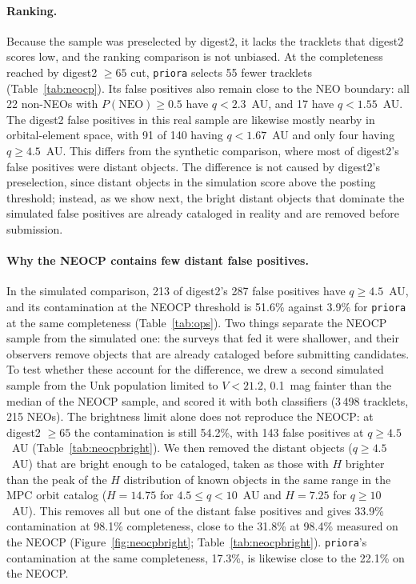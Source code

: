 \documentclass[linenumbers,twocolumn]{aastex701}
\newcommand{\priora}{{\tt priora}\xspace} %
\begin{document}
\paragraph{Ranking.}
Because the sample was preselected by digest2, it lacks the tracklets that
digest2 scores low, and the ranking comparison is not unbiased. At the
completeness reached by digest2 $\ge65$ cut, \priora selects
55 fewer tracklets (Table~\ref{tab:neocp}). Its false positives also remain
close to the NEO boundary: all 22 non-NEOs with
$P(\mathrm{NEO})\ge0.5$ have $q<2.3$~AU, and 17 have
$q<1.55$~AU. The digest2 false positives in this real sample are likewise
mostly nearby in orbital-element space, with 91 of 140 having
$q<1.67$~AU and only four having $q\ge4.5$~AU.
This differs from the synthetic comparison, where most of digest2's false
positives were distant objects. The difference is not caused by digest2's
preselection, since distant objects in the simulation score above the
posting threshold; instead, as we show next,
the bright distant objects that dominate the simulated false positives
are already cataloged in reality and are removed before submission.

\paragraph{Why the NEOCP contains few distant false positives.}
In the simulated comparison, 213 of digest2's 287 false positives have
$q\geq4.5$~AU, and its contamination at the NEOCP threshold is 51.6\%
against 3.9\% for \priora at the same completeness (Table~\ref{tab:ops}).
Two things separate the NEOCP sample from the simulated one: the surveys
that fed it were shallower, and their observers remove objects that are
already cataloged before submitting candidates. To test whether these
account for the difference, we drew a second simulated sample from the Unk
population limited to $V<21.2$, 0.1~mag fainter than the median of the NEOCP
sample, and scored it with both classifiers (3\,498 tracklets, 215 NEOs). The
brightness limit alone does not reproduce the NEOCP: at digest2 $\ge65$ the
contamination is still 54.2\%, with 143 false positives at $q\geq4.5$~AU
(Table~\ref{tab:neocpbright}). We then removed the distant objects
($q\geq4.5$~AU) that are bright enough to be cataloged, taken as those with
$H$ brighter than the peak of the $H$ distribution of known objects in the
same range in the MPC orbit catalog ($H=14.75$ for $4.5\le q<10$~AU and
$H=7.25$ for $q\geq10$~AU). This removes all but one of the distant false
positives and gives 33.9\% contamination at 98.1\% completeness, close to
the 31.8\% at 98.4\% measured on the NEOCP
(Figure~\ref{fig:neocpbright}; Table~\ref{tab:neocpbright}). \priora's
contamination at the same completeness, 17.3\%, is likewise close to the
22.1\% on the NEOCP. 
\end{document}
